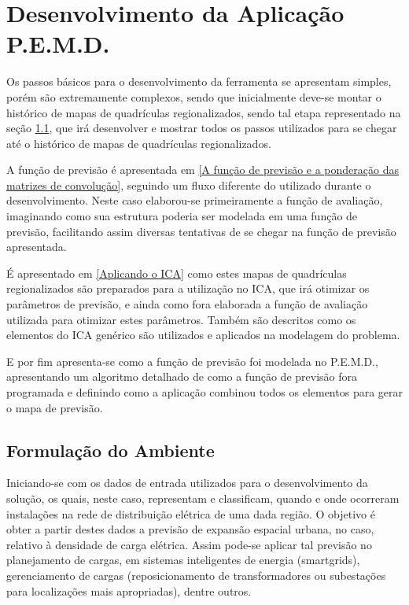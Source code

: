 \chapter{Desenvolvimento da Aplicação P.E.M.D.}
\label{Formulação do ambiente}


Os passos básicos para o desenvolvimento da ferramenta se apresentam simples, porém são extremamente complexos, sendo que inicialmente deve-se montar o histórico de mapas de quadrículas regionalizados, sendo tal etapa representado na seção \ref{Formulação do Ambiente}, que irá desenvolver e mostrar todos os passos utilizados para se chegar até o histórico de mapas de quadrículas regionalizados.

A função de previsão é apresentada em \ref{A função de previsão e a ponderação das matrizes de convolução}, seguindo um fluxo diferente do utilizado durante o desenvolvimento. Neste caso elaborou-se primeiramente a função de avaliação, imaginando como sua estrutura poderia ser modelada em uma função de previsão, facilitando assim diversas tentativas de se chegar na função de previsão apresentada. 

É apresentado em \ref{Aplicando o ICA} como estes mapas de quadrículas regionalizados são preparados para a utilização no ICA, que irá otimizar os parâmetros de previsão, e ainda como fora elaborada a função de avaliação utilizada para otimizar estes parâmetros. Também são descritos como os elementos do ICA genérico são utilizados e aplicados na modelagem do problema.

E por fim apresenta-se como a função de previsão foi modelada no P.E.M.D., apresentando um algoritmo detalhado de como a função de previsão fora programada e definindo como a aplicação combinou todos os elementos para gerar o mapa de previsão.


\section{Formulação do Ambiente}
\label{Formulação do Ambiente}

Iniciando-se com os dados de entrada utilizados para o desenvolvimento da solução, os quais, neste caso, representam e classificam, quando e onde ocorreram instalações na rede de distribuição elétrica de uma dada região. O objetivo é obter a partir destes dados a previsão de expansão espacial urbana, no caso, relativo à densidade de carga elétrica. Assim pode-se aplicar tal previsão no planejamento de cargas, em sistemas inteligentes de energia (smartgrids), gerenciamento de cargas (reposicionamento de transformadores ou subestações para localizações mais apropriadas), dentre outros. 

